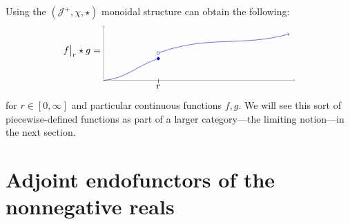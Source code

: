 \documentclass[11pt, one side, article]{memoir}
\theoremstyle{definition}
\theoremstyle{plain}
\newenvironment{example}
  {\pushQED{\qed}\renewcommand{\qedsymbol}{$\lozenge$}\examplex}
  {\popQED\endexamplex}
\newcommand{\cat}[1]{\mathcal{#1}}%
\newcommand{\blank}[1][1pt]{\hspace{#1}\cdot\hspace{#1}}
\newcommand{\rest}[2][\blank]{#1\big|_{#2}}
\begin{document}
\begin{example}
Using the $(\cat{J}^+,\chi,\star)$ monoidal structure can obtain the following:
\begin{equation}\label{eqn.lowersemicont}
\rest[f]{r}\star g=
\begin{tikzpicture}[baseline=(cop)]
	\draw[->, very thin] (0, 0) -- (7, 0);
	\draw[->, very thin] (0, 0) -- (0, 2);
	\node (sm) at (2,0) {$\shortmid$};
	\node[below=1pt] at (sm) {$r$};
	\begin{scope}[blue!70!black]
  	\node[circle, draw, inner sep=1pt, fill] at (2,.8) (ccl) {};
  	\draw (0, 0) to[out=5, in=200] (ccl);
  	\node[circle, draw, inner sep=1pt] at (2,1) (cop) {};
  	\draw[->] (cop) to[out=20, in=195] (6.8, 1.7);
	\end{scope}
\end{tikzpicture}
\end{equation}
for $r\in[0,\infty]$ and particular continuous functions $f,g$. We will see this sort of piecewise-defined functions as part of a larger category---the limiting notion---in the next section.

\end{example}

\section{Adjoint endofunctors of the nonnegative reals}
\end{document}
